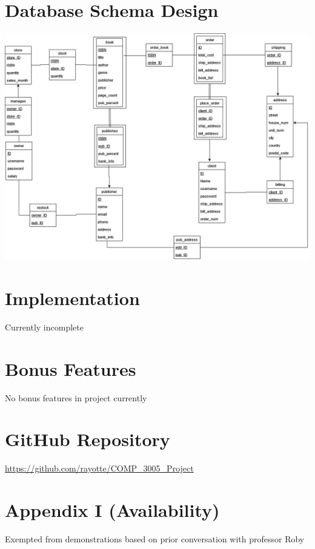 \documentclass[Project Report]{article}
\begin{document}
\section{Database Schema Design}
{\centering \includegraphics[width=\textwidth]{Schema_Diagram.png}}

\section{Implementation}
Currently incomplete

\section{Bonus Features}
No bonus features in project currently

\section{GitHub Repository}
\url{https://github.com/rayotte/COMP_3005_Project}

\section{Appendix I (Availability)}
Exempted from demonstrations based on prior conversation with professor Roby
\end{document}
